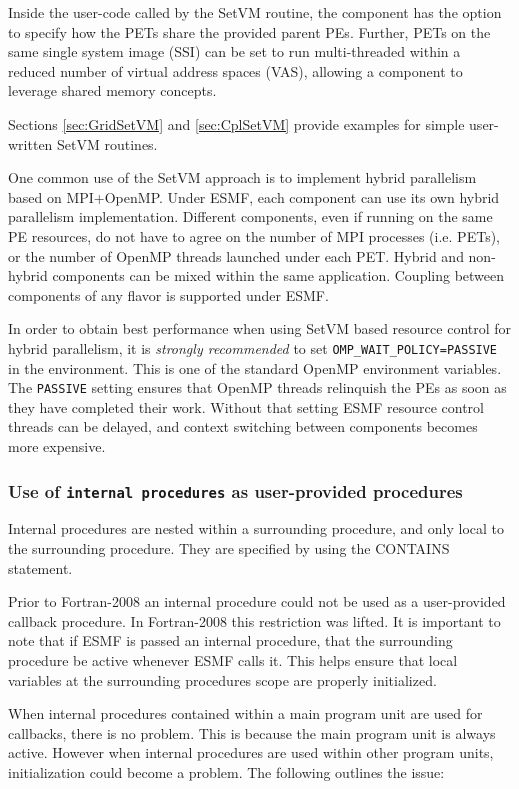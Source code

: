 Inside the user-code called by the SetVM routine, the component has the option to specify how the PETs share the provided parent PEs. Further, PETs on the same single system image (SSI) can be set to run multi-threaded within a reduced number of virtual address spaces (VAS), allowing a component to leverage shared memory concepts.

Sections \ref{sec:GridSetVM} and \ref{sec:CplSetVM} provide examples for
simple user-written SetVM routines.

One common use of the SetVM approach is to implement hybrid parallelism based on MPI+OpenMP. Under ESMF, each component can use its own hybrid parallelism implementation. Different components, even if running on the same PE resources, do not have to agree on the number of MPI processes (i.e. PETs), or the number of OpenMP threads launched under each PET. Hybrid and non-hybrid components can be mixed within the same application. Coupling between components of any flavor is supported under ESMF.

In order to obtain best performance when using SetVM based resource control for hybrid parallelism, it is {\em strongly recommended} to set {\tt OMP\_WAIT\_POLICY=PASSIVE} in the environment. This is one of the standard OpenMP environment variables. The {\tt PASSIVE} setting ensures that OpenMP threads relinquish the PEs as soon as they have completed their work. Without that setting ESMF resource control threads can be delayed, and context switching between components becomes more expensive.

\subsubsection{Use of {\tt internal procedures} as user-provided procedures}
\label{sec:AppDriverIntProc}

Internal procedures are nested within a surrounding procedure, and only local to the surrounding procedure.
They are specified by using the CONTAINS statement.

Prior to Fortran-2008 an internal procedure could not be used as a user-provided callback procedure.
In Fortran-2008 this restriction was lifted.  It is important to note that if ESMF is passed an internal
procedure, that the surrounding procedure be active whenever ESMF calls it.  This helps ensure that
local variables at the surrounding procedures scope are properly initialized.

When internal procedures contained within a main program unit are used for callbacks, there is no problem.
This is because the main program unit is always active.  However when internal procedures are used within
other program units, initialization could become a problem.  The following outlines the issue:

